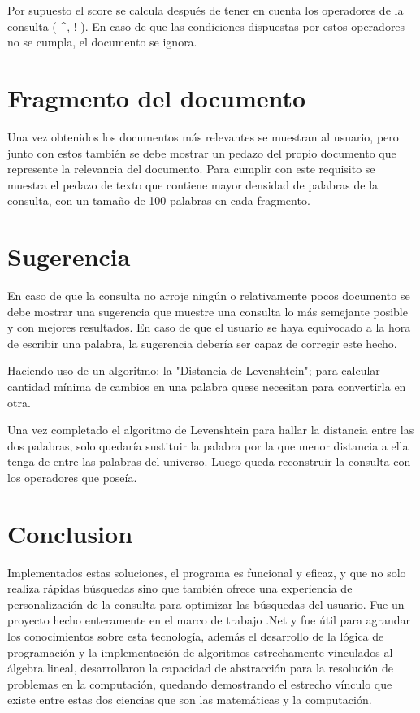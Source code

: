 \documentclass[10pt]{article}
\begin{document}
Por supuesto el score se calcula después de tener en cuenta los operadores de la consulta ( \textasciicircum{}, ! ). En caso de que las condiciones dispuestas por estos operadores no se cumpla, el documento se ignora.

\section{Fragmento del documento}
\label{sec:snippet}

Una vez obtenidos los documentos más relevantes se muestran al usuario, pero junto con estos también se debe mostrar un pedazo del propio documento que represente la relevancia del documento. Para cumplir con este requisito se muestra el pedazo de texto que contiene mayor densidad de palabras de la consulta, con un tamaño de 100 palabras en cada fragmento.

\section{Sugerencia}
\label{sec:suggestion}
 
En caso de que la consulta no arroje ningún o relativamente pocos documento se debe mostrar una sugerencia que muestre una consulta lo más semejante posible y con mejores resultados. En caso de que el usuario se haya equivocado a la hora de escribir una palabra, la sugerencia debería ser capaz de corregir este hecho.

Haciendo uso de un algoritmo: la "Distancia de Levenshtein"; para calcular cantidad mínima de cambios en una palabra quese necesitan para convertirla en otra.

Una vez completado el algoritmo de Levenshtein para hallar la distancia entre las dos palabras, solo quedaría sustituir la palabra por la que menor distancia a ella tenga de entre las palabras del universo. Luego queda reconstruir la consulta con los operadores que poseía.

\section{Conclusion}
\label{sec:end}

Implementados estas soluciones, el programa es funcional y eficaz, y que no solo realiza rápidas búsquedas sino que también ofrece una experiencia de personalización de la consulta para optimizar las búsquedas del usuario. Fue un proyecto hecho enteramente en el marco de trabajo .Net y fue útil para agrandar los conocimientos sobre esta tecnología, además el desarrollo de la lógica de programación y la implementación de algoritmos estrechamente vinculados al álgebra lineal, desarrollaron la capacidad de abstracción para la resolución de problemas en la computación, quedando demostrando el estrecho vínculo que existe entre estas dos ciencias que son las matemáticas y la computación.

\clearpage
\endgroup %
\end{document}
